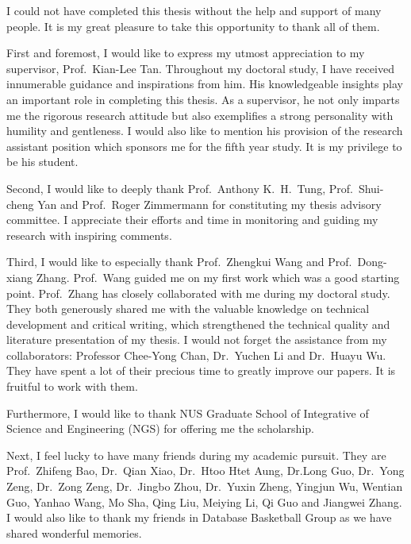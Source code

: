 \begin{acknowledgements}
I could not have completed this thesis without the help and support of many people.
It is my great pleasure to take this opportunity to thank all of them.
%

First and foremost, I would like to express my utmost appreciation to 
my supervisor, Prof.~Kian-Lee Tan. Throughout my doctoral study, I have
received innumerable guidance and inspirations from him. His knowledgeable
insights play an important role in completing this thesis. As
a supervisor, he not only imparts me the rigorous research attitude
but also exemplifies a strong personality with
humility and gentleness. 
I would also like to mention his provision of the research assistant position which
sponsors me for the fifth year study. It is my privilege to be his student.

Second, I would like to deeply thank Prof.~Anthony K.~H.~Tung, Prof.~Shui-cheng Yan 
and Prof.~Roger Zimmermann for constituting my thesis advisory committee. 
I appreciate their efforts and time in monitoring and guiding my research with
inspiring comments. 


Third, I would like to especially thank Prof.~Zhengkui Wang and Prof.~Dong-xiang Zhang.
Prof.~Wang guided me on my first work which was a good starting point.
Prof.~Zhang has closely collaborated with me during my doctoral study. They
both generously shared me with the valuable knowledge on technical development 
and critical writing, which strengthened 
the technical quality and
literature presentation of my thesis.
I would not forget the assistance from my collaborators: Professor Chee-Yong Chan,
Dr.~Yuchen Li and Dr.~Huayu Wu. They have spent a lot of their precious time to greatly improve
our papers. It is fruitful to work with them.

Furthermore, I would like to thank NUS Graduate School of Integrative of Science and
Engineering (NGS) for offering me the scholarship.

Next, I feel lucky to have many friends during my academic
pursuit. They are Prof.~Zhifeng Bao, Dr.~Qian Xiao, Dr.~Htoo Htet Aung,
Dr.Long Guo, Dr.~Yong Zeng, Dr.~Zong Zeng, Dr.~Jingbo Zhou, Dr.~Yuxin Zheng, Yingjun Wu, Wentian Guo,
Yanhao Wang, Mo Sha, Qing Liu, Meiying Li, Qi Guo and Jiangwei Zhang. I would also 
like to thank my friends in Database Basketball Group %
as we have shared wonderful memories.


\end{acknowledgements}
